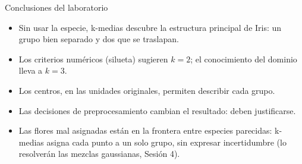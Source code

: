 \begin{frame}{Conclusiones del laboratorio}
  \begin{itemize}
    \item Sin usar la especie, k-medias descubre la estructura principal de Iris:
          un grupo bien separado y dos que se traslapan.
    \item Los criterios numéricos (silueta) sugieren $k=2$; el conocimiento del dominio lleva a $k=3$.
    \item Los centros, en las unidades originales, permiten describir cada grupo.
    \item Las decisiones de preprocesamiento cambian el resultado: deben justificarse.
    \item Las flores mal asignadas están en la frontera entre especies parecidas:
          k-medias asigna cada punto a un solo grupo, sin expresar incertidumbre
          (lo resolverán las mezclas gaussianas, Sesión 4).
  \end{itemize}
\end{frame}

